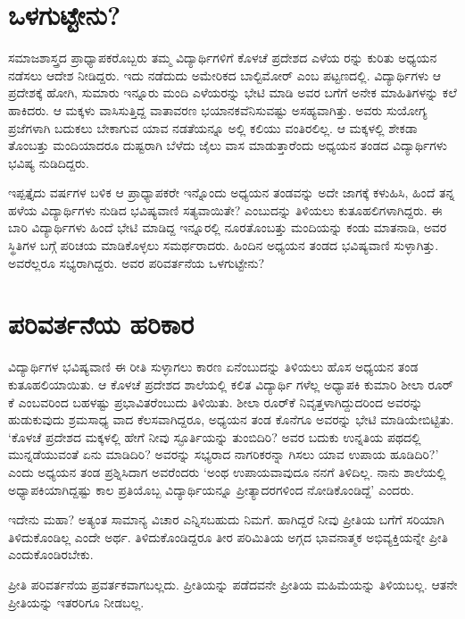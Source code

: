 \section{ಒಳಗುಟ್ಟೇನು?}

ಸಮಾಜಶಾಸ್ತ್ರದ ಪ್ರಾಧ್ಯಾಪಕರೊಬ್ಬರು ತಮ್ಮ ವಿದ್ಯಾರ್ಥಿಗಳಿಗೆ ಕೊಳಚೆ ಪ್ರದೇಶದ ಎಳೆಯ ರನ್ನು ಕುರಿತು ಅಧ್ಯಯನ ನಡೆಸಲು ಆದೇಶ ನೀಡಿದ್ದರು. ಇದು ನಡೆದುದು ಅಮೇರಿಕದ ಬಾಲ್ಟಿಮೋರ್ ಎಂಬ ಪಟ್ಟಣದಲ್ಲಿ. ವಿದ್ಯಾರ್ಥಿಗಳು ಆ ಪ್ರದೇಶಕ್ಕೆ ಹೋಗಿ, ಸುಮಾರು ಇನ್ನೂರು ಮಂದಿ ಎಳೆಯರನ್ನು ಭೇಟಿ ಮಾಡಿ ಅವರ ಬಗೆಗೆ ಅನೇಕ ಮಾಹಿತಿಗಳನ್ನು ಕಲೆ ಹಾಕಿದರು. ಆ ಮಕ್ಕಳು ವಾಸಿಸುತ್ತಿದ್ದ ವಾತಾವರಣ ಭಯಾನಕವೆನಿಸುವಷ್ಟು ಅಸಹ್ಯವಾಗಿತ್ತು. ಅವರು ಸುಯೋಗ್ಯ ಪ್ರಜೆಗಳಾಗಿ ಬದುಕಲು ಬೇಕಾಗುವ ಯಾವ ನಡತೆಯನ್ನೂ ಅಲ್ಲಿ ಕಲಿಯು ವಂತಿರಲಿಲ್ಲ. ಆ ಮಕ್ಕಳಲ್ಲಿ ಶೇಕಡಾ ತೊಂಬತ್ತು ಮಂದಿಯಾದರೂ ದುಷ್ಟರಾಗಿ ಬೆಳೆದು ಜೈಲು ವಾಸ ಮಾಡುತ್ತಾರೆಂದು ಅಧ್ಯಯನ ತಂಡದ ವಿದ್ಯಾರ್ಥಿಗಳು ಭವಿಷ್ಯ ನುಡಿದಿದ್ದರು.

ಇಪ್ಪತ್ತೈದು ವರ್ಷಗಳ ಬಳಿಕ ಆ ಪ್ರಾಧ್ಯಾಪಕರೇ ಇನ್ನೊಂದು ಅಧ್ಯಯನ ತಂಡವನ್ನು ಅದೇ ಜಾಗಕ್ಕೆ ಕಳುಹಿಸಿ, ಹಿಂದೆ ತನ್ನ ಹಳೆಯ ವಿದ್ಯಾರ್ಥಿಗಳು ನುಡಿದ ಭವಿಷ್ಯವಾಣಿ ಸತ್ಯವಾಯಿತೇ? ಎಂಬುದನ್ನು ತಿಳಿಯಲು ಕುತೂಹಲಿಗಳಾಗಿದ್ದರು. ಈ ಬಾರಿ ವಿದ್ಯಾರ್ಥಿಗಳು ಹಿಂದೆ ಭೇಟಿ ಮಾಡಿದ್ದ ಇನ್ನೂರಲ್ಲಿ ನೂರತೊಂಬತ್ತು ಮಂದಿಯನ್ನು ಕಂಡು ಮಾತನಾಡಿ, ಅವರ ಸ್ಥಿತಿಗಳ ಬಗ್ಗೆ ಪರಿಚಯ ಮಾಡಿಕೊಳ್ಳಲು ಸಮರ್ಥರಾದರು. ಹಿಂದಿನ ಅಧ್ಯಯನ ತಂಡದ ಭವಿಷ್ಯವಾಣಿ ಸುಳ್ಳಾಗಿತ್ತು. ಅವರೆಲ್ಲರೂ ಸಭ್ಯರಾಗಿದ್ದರು. ಅವರ ಪರಿವರ್ತನೆಯ ಒಳಗುಟ್ಟೇನು?


\section{ಪರಿವರ್ತನೆಯ ಹರಿಕಾರ}

ವಿದ್ಯಾರ್ಥಿಗಳ ಭವಿಷ್ಯವಾಣಿ ಈ ರೀತಿ ಸುಳ್ಳಾಗಲು ಕಾರಣ ಏನೆಂಬುದನ್ನು ತಿಳಿಯಲು ಹೊಸ ಅಧ್ಯಯನ ತಂಡ ಕುತೂಹಲಿಯಾಯಿತು. ಆ ಕೊಳಚೆ ಪ್ರದೇಶದ ಶಾಲೆಯಲ್ಲಿ ಕಲಿತ ವಿದ್ಯಾರ್ಥಿ ಗಳೆಲ್ಲ ಅಧ್ಯಾಪಕಿ ಕುಮಾರಿ ಶೀಲಾ ರೂರ್​ಕೆ ಎಂಬವರಿಂದ ಬಹಳಷ್ಟು ಪ್ರಭಾವಿತರೆಂಬುದು ತಿಳಿಯಿತು. ಶೀಲಾ ರೂರ್​ಕೆ ನಿವೃತ್ತಳಾಗಿದ್ದುದರಿಂದ ಅವರನ್ನು ಹುಡುಕುವುದು ಶ್ರಮಸಾಧ್ಯ ವಾದ ಕೆಲಸವಾಗಿದ್ದರೂ, ಅಧ್ಯಯನ ತಂಡ ಕೊನೆಗೂ ಅವರನ್ನು ಭೇಟಿ ಮಾಡಿಯೇಬಿಟ್ಟಿತು. ‘ಕೊಳಚೆ ಪ್ರದೇಶದ ಮಕ್ಕಳಲ್ಲಿ ಹೇಗೆ ನೀವು ಸ್ಫೂರ್ತಿಯನ್ನು ತುಂಬಿದಿರಿ? ಅವರ ಬದುಕು ಉನ್ನತಿಯ ಪಥದಲ್ಲಿ ಮುನ್ನಡೆಯುವಂತೆ ಏನು ಮಾಡಿದಿರಿ? ಅವರನ್ನು ಸಭ್ಯರಾದ ನಾಗರಿಕರನ್ನಾ ಗಿಸಲು ಯಾವ ಉಪಾಯ ಹೂಡಿದಿರಿ?’ ಎಂದು ಅಧ್ಯಯನ ತಂಡ ಪ್ರಶ್ನಿಸಿದಾಗ ಅವರೆಂದರು ‘ಅಂಥ ಉಪಾಯವಾವುದೂ ನನಗೆ ತಿಳಿದಿಲ್ಲ. ನಾನು ಶಾಲೆಯಲ್ಲಿ ಅಧ್ಯಾಪಕಿಯಾಗಿದ್ದಷ್ಟು ಕಾಲ ಪ್ರತಿಯೊಬ್ಬ ವಿದ್ಯಾರ್ಥಿಯನ್ನೂ ಪ್ರೀತ್ಯಾದರಗಳಿಂದ ನೋಡಿಕೊಂಡಿದ್ದೆ’ ಎಂದರು.

ಇದೇನು ಮಹಾ? ಅತ್ಯಂತ ಸಾಮಾನ್ಯ ವಿಚಾರ ಎನ್ನಿಸಬಹುದು ನಿಮಗೆ. ಹಾಗಿದ್ದರೆ ನೀವು ಪ್ರೀತಿಯ ಬಗೆಗೆ ಸರಿಯಾಗಿ ತಿಳಿದುಕೊಂಡಿಲ್ಲ ಎಂದೇ ಅರ್ಥ. ತಿಳಿದುಕೊಂಡಿದ್ದರೂ ತೀರ ಪರಿಮಿತಿಯ ಅಗ್ಗದ ಭಾವನಾತ್ಮಕ ಅಭಿವ್ಯಕ್ತಿಯನ್ನೇ ಪ್ರೀತಿ ಎಂದುಕೊಂಡಿರಬೇಕು.

ಪ್ರೀತಿ ಪರಿವರ್ತನೆಯ ಪ್ರವರ್ತಕವಾಗಬಲ್ಲದು. ಪ್ರೀತಿಯನ್ನು ಪಡೆದವನೇ ಪ್ರೀತಿಯ ಮಹಿಮೆಯನ್ನು ತಿಳಿಯಬಲ್ಲ. ಆತನೇ ಪ್ರೀತಿಯನ್ನು ಇತರರಿಗೂ ನೀಡಬಲ್ಲ.

